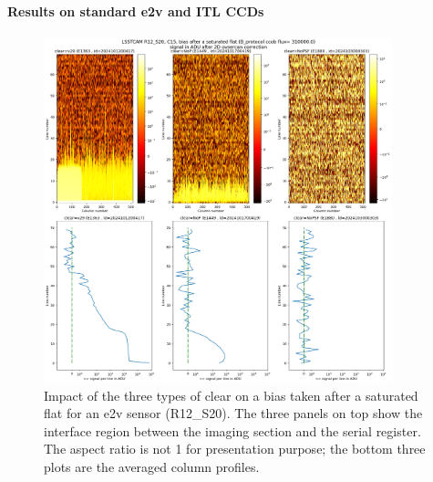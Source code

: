 \paragraph{Results on standard e2v and ITL CCDs}\label{results-on-standard-e2v-and-itl-ccd}

\begin{figure}[ht]
\begin{centering}
\includegraphics[width=0.9\textwidth]{figures/plots_R12_S20_C15_E1880_bias_2024103000303.png}
\end{centering}
\caption{Impact of the three types of clear on a bias
taken after a saturated flat for an e2v sensor (R12\_S20).
The three panels on top show the interface region between the imaging section and the serial register. The aspect ratio is not 1 for presentation purpose; the bottom three plots are the averaged column profiles.}
\label{fig:clear_e2v}
\end{figure}


